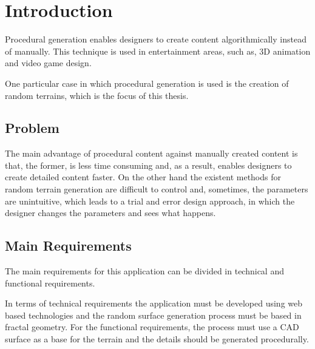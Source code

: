 \chapter{Introduction}

Procedural generation enables designers to create content algorithmically instead of manually. This technique is used in entertainment areas, such as, 3D animation and video game design.

One particular case in which procedural generation is used is the creation of random terrains, which is the focus of this thesis.


\section {Problem}

The main advantage of procedural content against manually created content is that, the former, is less time consuming and, as a result, enables designers to create detailed content faster. On the other hand the existent methods for random terrain generation are difficult to control and, sometimes, the parameters are unintuitive, which leads to a trial and error design approach, in which the designer changes the parameters and sees what happens.

\section{Main Requirements}

The main requirements for this application can be divided in technical and functional requirements.

In terms of technical requirements the application must be developed using web based technologies and the random surface generation process must be based in fractal geometry. For the functional requirements, the process must use a CAD surface as a base for the terrain and the details should be generated procedurally.

